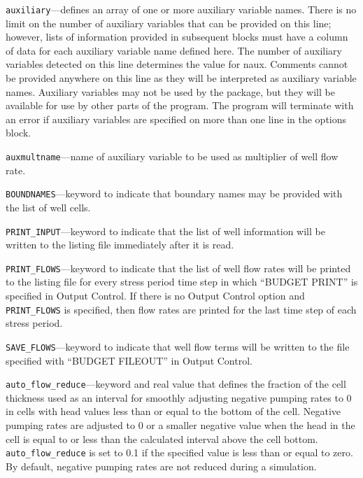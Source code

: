 
\item \texttt{auxiliary}---defines an array of one or more auxiliary variable names.  There is no limit on the number of auxiliary variables that can be provided on this line; however, lists of information provided in subsequent blocks must have a column of data for each auxiliary variable name defined here.   The number of auxiliary variables detected on this line determines the value for naux.  Comments cannot be provided anywhere on this line as they will be interpreted as auxiliary variable names.  Auxiliary variables may not be used by the package, but they will be available for use by other parts of the program.  The program will terminate with an error if auxiliary variables are specified on more than one line in the options block.

\item \texttt{auxmultname}---name of auxiliary variable to be used as multiplier of well flow rate.

\item \texttt{BOUNDNAMES}---keyword to indicate that boundary names may be provided with the list of well cells.

\item \texttt{PRINT\_INPUT}---keyword to indicate that the list of well information will be written to the listing file immediately after it is read.

\item \texttt{PRINT\_FLOWS}---keyword to indicate that the list of well flow rates will be printed to the listing file for every stress period time step in which ``BUDGET PRINT'' is specified in Output Control.  If there is no Output Control option and \texttt{PRINT\_FLOWS} is specified, then flow rates are printed for the last time step of each stress period.

\item \texttt{SAVE\_FLOWS}---keyword to indicate that well flow terms will be written to the file specified with ``BUDGET FILEOUT'' in Output Control.

\item \texttt{auto\_flow\_reduce}---keyword and real value that defines the fraction of the cell thickness used as an interval for smoothly adjusting negative pumping rates to 0 in cells with head values less than or equal to the bottom of the cell. Negative pumping rates are adjusted to 0 or a smaller negative value when the head in the cell is equal to or less than the calculated interval above the cell bottom. \texttt{auto\_flow\_reduce} is set to 0.1 if the specified value is less than or equal to zero. By default, negative pumping rates are not reduced during a simulation.

